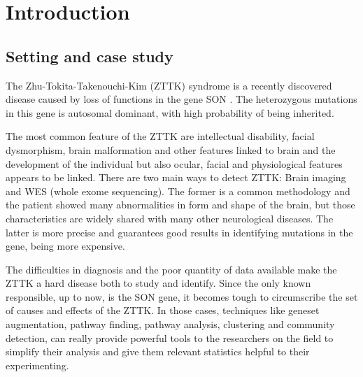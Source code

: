 \section{Introduction}\label{sec:introduction}
\subsection{Setting and case study}\label{subsec:settings_case_study}
The Zhu-Tokita-Takenouchi-Kim (ZTTK) syndrome is a recently discovered disease caused by loss of functions in the gene SON \cite{kushary2021zttk}. The heterozygous mutations in this gene is autosomal dominant, with high probability of being inherited.
\vspace{3mm}

The most common feature of the ZTTK are intellectual disability, facial dysmorphism, brain malformation and other features linked to brain and the development of the individual but also ocular, facial and physiological features appears to be linked. There are two main ways to detect ZTTK: Brain imaging and WES (whole exome sequencing). The former is a common methodology and the patient showed many abnormalities in form and shape of the brain, but those characteristics are widely shared with many other neurological diseases. The latter is more precise and guarantees good results in identifying mutations in the gene, being more expensive.
\vspace{3mm}

The difficulties in diagnosis and the poor quantity of data available make the ZTTK a hard disease both to study and identify. Since the only known responsible, up to now, is the SON gene, it becomes tough to circumscribe the set of causes and effects of the ZTTK. In those cases, techniques like geneset augmentation, pathway finding, pathway analysis, clustering and community detection, can really provide powerful tools to the researchers on the field to simplify their analysis and give them relevant statistics helpful to their experimenting.

